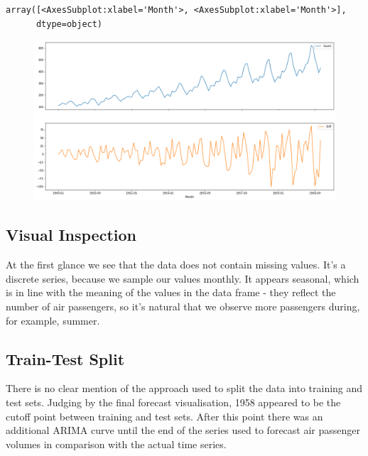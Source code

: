 \documentclass[
  letterpaper,
  DIV=11,
  numbers=noendperiod]{scrartcl}
\begin{document}
\begin{verbatim}
array([<AxesSubplot:xlabel='Month'>, <AxesSubplot:xlabel='Month'>],
      dtype=object)
\end{verbatim}

\begin{figure}[H]

{\centering \includegraphics{main_files/figure-pdf/cell-7-output-2.png}

}

\end{figure}

\hypertarget{visual-inspection}{%
\subsection{Visual Inspection}\label{visual-inspection}}

At the first glance we see that the data does not contain missing
values. It's a discrete series, because we sample our values monthly. It
appears seasonal, which is in line with the meaning of the values in the
data frame - they reflect the number of air passengers, so it's natural
that we observe more passengers during, for example, summer.

\hypertarget{train-test-split}{%
\subsection{Train-Test Split}\label{train-test-split}}

There is no clear mention of the approach used to split the data into
training and test sets. Judging by the final forecast visualisation,
1958 appeared to be the cutoff point between training and test sets.
After this point there was an additional ARIMA curve until the end of
the series used to forecast air passenger volumes in comparison with the
actual time series.
\end{document}
